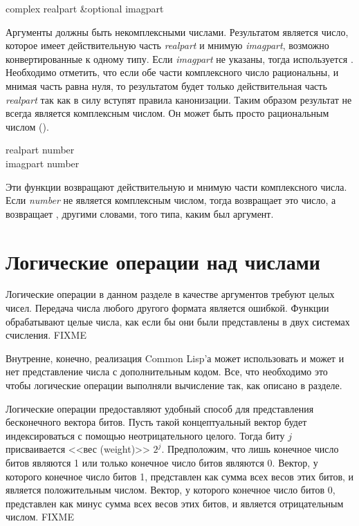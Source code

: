 \begin{defun}[Функция]
complex realpart &optional imagpart

Аргументы должны быть некомплексными числами. Результатом является число,
которое имеет действительную часть \emph{realpart} и мнимую \emph{imagpart},
возможно конвертированные к одному типу.
Если \emph{imagpart} не указаны, тогда используется .
Необходимо отметить, что если обе части комплексного число рациональны, и мнимая
часть равна нуля, то результатом будет только действительная часть
\emph{realpart} так как в силу вступят правила канонизации.
Таким образом результат  не всегда является комплексным числом. Он
может быть просто рациональным числом ().
\end{defun}

\begin{defun}[Функция]
realpart number \\
imagpart number

Эти функции возвращают действительную и мнимую части комплексного числа. Если
\emph{number} не является комплексным числом, тогда  возвращает
это число, а  возвращает , другими
словами,  того типа, каким был аргумент.
\end{defun}

\section{Логические операции над числами}

Логические операции в данном разделе в качестве аргументов требуют целых
чисел. Передача числа любого другого формата является ошибкой.
Функции обрабатывают целые числа, как если бы они были представлены в двух
системах счисления. FIXME

\beforenoterule
\begin{implementation}
Внутренне, конечно, реализация Common Lisp'а может использовать и может и нет
представление числа с дополнительным кодом. Все, что необходимо это чтобы
логические операции выполняли вычисление так, как описано в разделе.
\end{implementation}
\afternoterule

Логические операции предоставляют удобный способ для представления бесконечного
вектора битов. Пусть такой концептуальный вектор будет индексироваться с помощью
неотрицательного целого. Тогда биту $j$ присваивается <<вес (weight)>> $2^{j}$.
Предположим, что лишь конечное число битов являются 1 или только конечное
число битов являются 0.
Вектор, у которого конечное число битов 1, представлен как сумма всех весов этих
битов, и является положительным числом.
Вектор, у которого конечное число битов 0, представлен как  минус сумма
всех весов этих битов, и является отрицательным числом. FIXME

